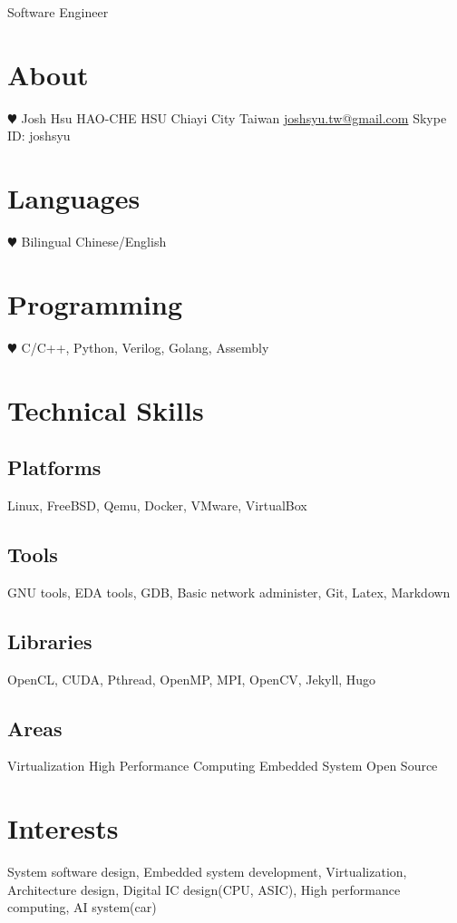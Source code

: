 \documentclass[]{friggeri-cv}
\begin{document}
       {Software Engineer}


\begin{aside}
  \section{About}
    {\color{red} $\varheartsuit$} 
    Josh Hsu
    HAO-CHE HSU
	Chiayi City
    Taiwan
	\href{joshsyu.tw@gmail.com}{joshsyu.tw@gmail.com}
	Skype ID: joshsyu
  \section{Languages}
    {\color{red} $\varheartsuit$} 
  	Bilingual Chinese/English
  \section{Programming}
    {\color{red} $\varheartsuit$} 
	C/C++, Python, Verilog, Golang, Assembly 
  \section{Technical Skills}
  \subsection{Platforms}
	Linux, FreeBSD, Qemu, Docker, VMware, VirtualBox
  \subsection{Tools}
	GNU tools, EDA tools, GDB, Basic network administer, Git, Latex, Markdown
  \subsection{Libraries}
	OpenCL, CUDA, Pthread, OpenMP, MPI, OpenCV, Jekyll, Hugo
  \subsection{Areas}
	Virtualization
	High Performance Computing
	Embedded System
	Open Source
\end{aside}

\section{Interests}

System software design, Embedded system development,
Virtualization, Architecture design, Digital IC design(CPU, ASIC), 
High performance computing, AI system(car)
\end{document}
